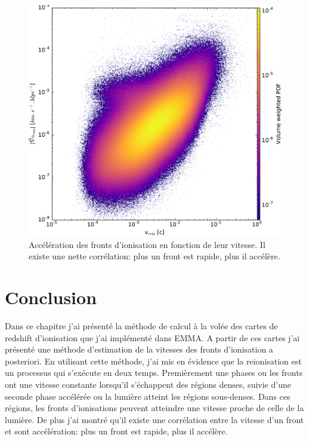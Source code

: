 \begin{figure}
        \includegraphics[width=.95\linewidth]{img/04_mapreio/v_gradv_c1.pdf} 
        \caption[Évolution de l'accélération des fronts]{Accélération des fronts d'ionisation en fonction de leur vitesse.
        Il existe une nette corrélation: plus un front est rapide, plus il accélère.
 		\label{fig:accspeed}}
\end{figure}


\section{Conclusion}
Dans ce chapitre j'ai présenté la méthode de calcul à la volée des cartes de redshift d'ionisation que j'ai implémenté dans EMMA.
A partir de ces cartes j'ai présenté une méthode d’estimation de la vitesses des fronts d'ionisation a posteriori.
En utilisant cette méthode, j'ai mis en évidence que la reionisation est un processus qui s’exécute en deux temps.
Premièrement une phases ou les fronts ont une vitesse constante lorsqu'il s'échappent des régions denses, suivie d'une seconde phase accélérée ou la lumière atteint les régions sous-denses.
Dans ces régions, les fronts d'ionisations peuvent atteindre une vitesse proche de celle de la lumière.
De plus j'ai montré qu'il existe une corrélation entre la vitesse d'un front et sont accélération: plus un front est rapide, plus il accélère.



